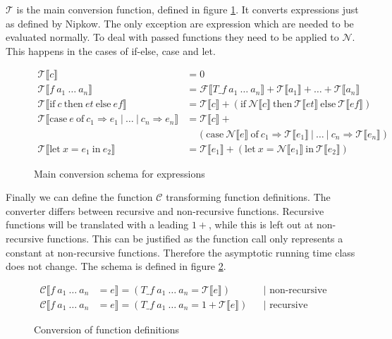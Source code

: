 $\mathcal{T}$ is the main conversion function, defined in figure \ref{fig:schema_T}.
It converts expressions just as defined by Nipkow.
The only exception are expression which are needed to be evaluated normally.
To deal with passed functions they need to be applied to $\mathcal{N}$.
This happens in the cases of if-else, case and let.
\begin{figure}
\begin{align*}
  \mathcal{T}\llbracket c\rrbracket &= 0\\
  \mathcal{T}\llbracket f\ a_{1}\ \dots\ a_{n}\rrbracket &= \mathcal{F}\llbracket T\_f\ a_{1}\ \dots\ a_{n}\rrbracket + \mathcal{T}\llbracket a_{1}\rrbracket + \dots + \mathcal{T}\llbracket a_{n}\rrbracket\\
  \mathcal{T}\llbracket \text{if}\ c\ \text{then}\ et\ \text{else}\ ef\rrbracket &= \mathcal{T}\llbracket c\rrbracket + (\text{if}\ \mathcal{N}\llbracket c\rrbracket\ \text{then}\ \mathcal{T}\llbracket et\rrbracket\ \text{else}\ \mathcal{T}\llbracket ef\rrbracket)\\
  \mathcal{T}\llbracket \text{case}\ e\ \text{of}\ c_{1} \Rightarrow e_{1}\ |\ \dots\ |\ c_{n}\Rightarrow e_{n}\rrbracket &= \mathcal{T}\llbracket c\rrbracket + \\&\ \ \ \ \ (\text{case}\ \mathcal{N}\llbracket e\rrbracket\ \text{of}\ c_{1}\Rightarrow\mathcal{T}\llbracket e_{1}\rrbracket\ |\ \dots\ |\ c_{n} \Rightarrow \mathcal{T}\llbracket e_{n}\rrbracket)\\
  \mathcal{T}\llbracket \text{let}\ x = e_{1}\ \text{in}\ e_{2}\rrbracket &= \mathcal{T}\llbracket e_{1}\rrbracket + (\text{let}\ x = \mathcal{N}\llbracket e_{1}\rrbracket\ \text{in}\ \mathcal{T}\llbracket e_{2}\rrbracket)
\end{align*}
  \caption{Main conversion schema for expressions}
  \label{fig:schema_T}
\end{figure}

Finally we can define the function $\mathcal{C}$ transforming function definitions.
The converter differs between recursive and non-recursive functions.
Recursive functions will be translated with a leading $1+$, while this is left out at non-recursive functions.
This can be justified as the function call only represents a constant at non-recursive functions.
Therefore the asymptotic running time class does not change.
The schema is defined in figure \ref{fig:schema_C}.

\begin{figure}
  \begin{align*}
    \mathcal{C}\llbracket f\ a_1\ \dots\ a_n &= e\rrbracket = (T\_f\ a_{1}\ \dots\ a_{n} = \mathcal{T}\llbracket e\rrbracket) &&\text{| non-recursive}\\
    \mathcal{C}\llbracket f\ a_1\ \dots\ a_n &= e\rrbracket = (T\_f\ a_{1}\ \dots\ a_{n} = 1 + \mathcal{T}\llbracket e\rrbracket) &&\text{| recursive}
  \end{align*}
  \caption{Conversion of function definitions}
  \label{fig:schema_C}
\end{figure}
